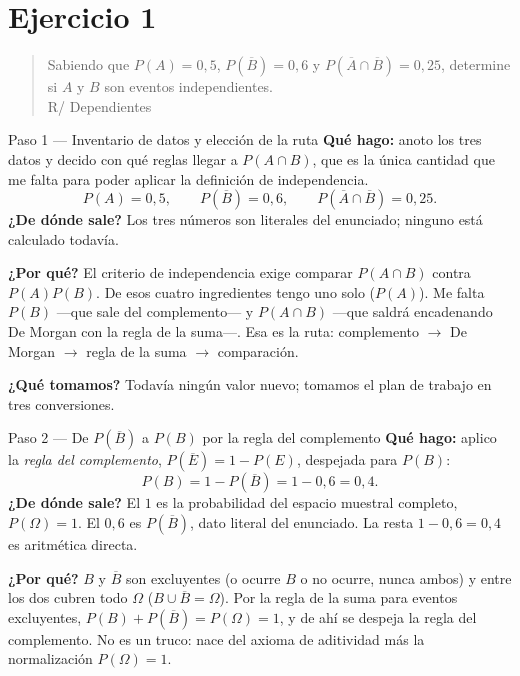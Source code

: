 \documentclass[11pt]{article}
\begin{document}
\section*{Ejercicio 1}

\begin{quote}
Sabiendo que $P(A)=0,5$, $P(\overline{B})=0,6$ y $P(\overline{A}\cap\overline{B})=0,25$, determine si $A$ y $B$ son eventos independientes.\\[2pt]
\hspace*{\fill}R/ Dependientes
\end{quote}

\begin{sol}
\begin{paso}{Paso 1 --- Inventario de datos y elección de la ruta}
\textbf{Qué hago:} anoto los tres datos y decido con qué reglas llegar a $P(A\cap B)$, que es
la única cantidad que me falta para poder aplicar la definición de independencia.
\[
P(A)=0{,}5,\qquad P(\overline{B})=0{,}6,\qquad P(\overline{A}\cap\overline{B})=0{,}25.
\]
\textbf{¿De dónde sale?} Los tres números son literales del enunciado; ninguno está
calculado todavía.

\textbf{¿Por qué?} El criterio de independencia exige comparar $P(A\cap B)$ contra
$P(A)P(B)$. De esos cuatro ingredientes tengo uno solo ($P(A)$). Me falta $P(B)$ ---que sale
del complemento--- y $P(A\cap B)$ ---que saldrá encadenando De Morgan con la regla de la
suma---. Esa es la ruta: complemento $\to$ De Morgan $\to$ regla de la suma $\to$
comparación.

\textbf{¿Qué tomamos?} Todavía ningún valor nuevo; tomamos el plan de trabajo en tres
conversiones.
\end{paso}

\begin{paso}{Paso 2 --- De $P(\overline{B})$ a $P(B)$ por la regla del complemento}
\textbf{Qué hago:} aplico la \emph{regla del complemento}, $P(\overline{E})=1-P(E)$, despejada
para $P(B)$:
\[
P(B)=1-P(\overline{B})=1-0{,}6=0{,}4.
\]
\textbf{¿De dónde sale?} El $1$ es la probabilidad del espacio muestral completo,
$P(\Omega)=1$. El $0{,}6$ es $P(\overline{B})$, dato literal del enunciado. La resta
$1-0{,}6=0{,}4$ es aritmética directa.

\textbf{¿Por qué?} $B$ y $\overline{B}$ son excluyentes (o ocurre $B$ o no ocurre, nunca
ambos) y entre los dos cubren todo $\Omega$ ($B\cup\overline{B}=\Omega$). Por la regla de la
suma para eventos excluyentes, $P(B)+P(\overline{B})=P(\Omega)=1$, y de ahí se despeja la
regla del complemento. No es un truco: nace del axioma de aditividad más la normalización
$P(\Omega)=1$.


\end{paso}
\end{sol}
\end{document}

